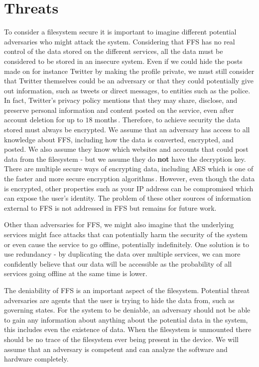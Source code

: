 \section{Threats}
To consider a filesystem secure it is important to imagine different potential adversaries who might attack the system. Considering that FFS has no real control of the data stored on the different services, all the data must be considered to be stored in an insecure system. Even if we could hide the posts made on for instance Twitter by making the profile private, we must still consider that Twitter themselves could be an adversary or that they could potentially give out information, such as tweets or direct messages, to entities such as the police. In fact, Twitter's privacy policy mentions that they may share, disclose, and preserve personal information and content posted on the service, even after account deletion for up to $18$ months\,\cite{TwitterPrivacyPolicy}. Therefore, to achieve security the data stored must always be encrypted. We assume that an adversary has access to all knowledge about FFS, including how the data is converted, encrypted, and posted. We also assume they know which websites and accounts that could post data from the filesystem - but we assume they do \textbf{not} have the decryption key. There are multiple secure ways of encrypting data, including AES which is one of the faster and more secure encryption algorithms\,\cite{mahajanStudyEncryptionAlgorithms2013}. However, even though the data is encrypted, other properties such as your IP address can be compromised which can expose the user's identity. The problem of these other sources of information external to FFS is not addressed in FFS but remains for future work.

Other than adversaries for FFS, we might also imagine that the underlying services might face attacks that can potentially harm the security of the system or even cause the service to go offline, potentially indefinitely. One solution is to use redundancy - by duplicating the data over multiple services, we can more confidently believe that our data will be accessible as the probability of all services going offline at the same time is lower.

The deniability of FFS is an important aspect of the filesystem. Potential threat adversaries are agents that the user is trying to hide the data from, such as governing states. For the system to be deniable, an adversary should not be able to gain any information about anything about the potential data in the system, this includes even the existence of data. When the filesystem is unmounted there should be no trace of the filesystem ever being present in the device. We will assume that an adversary is competent and can analyze the software and hardware completely.